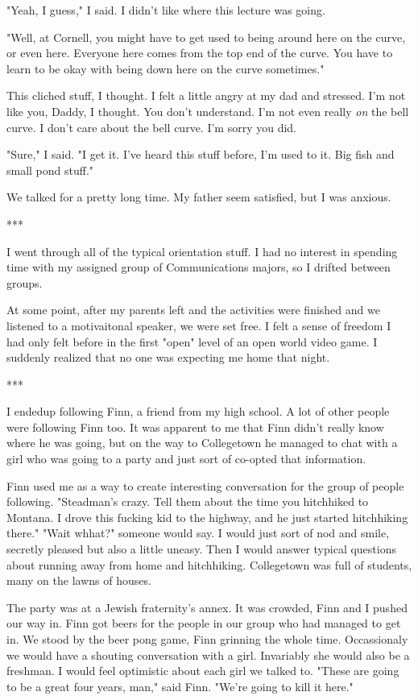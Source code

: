 \documentclass[12pt]{article}
\begin{document}
"Yeah, I guess," I said.  I didn't like where this lecture was going.

"Well, at Cornell, you might have to get used to being around here on the curve,
or even here.  Everyone here comes from the top end of the curve.  You have to
learn to be okay with being down here on the curve sometimes."

This cliched stuff, I thought.  I felt a little angry at my dad and stressed.
I'm not like you, Daddy, I thought.  You don't understand.  I'm not even really
\textit{on} the bell curve.  I don't care about the bell curve.  I'm sorry you
did.

"Sure," I said.  "I get it.  I've heard this stuff before, I'm used to it.  Big
fish and small pond stuff."

We talked for a pretty long time.  My father seem satisfied, but I was anxious.

***

I went through all of the typical orientation stuff.  I had no interest in
spending time with my assigned group of Communications majors, so I
drifted between groups. 

At some point, after my parents left and the activities were finished and we
listened to a motivaitonal speaker, we were set free.  I felt a sense of freedom
I had only felt before in the first "open" level of an open world video game.  I
suddenly realized that no one was expecting me home that night.

***

I endedup following Finn, a friend from my high school.  A lot of other people
were following Finn too.  It was apparent to me that Finn didn't really know
where he was going, but on the way to Collegetown he managed to chat with a girl
who was going to a party and just sort of co-opted that information.  

Finn used me as a way to create interesting conversation for the group of people
following.  "Steadman's crazy.  Tell them about the time you hitchhiked
to Montana.  I drove this fucking kid to the highway, and he just started
hitchhiking there."  "Wait whhat?" someone would say.  I would just sort of nod and
smile, secretly pleased but also a little uneasy.  Then I would answer typical
questions about running away from home and hitchhiking.  Collegetown was full of
students, many on the lawns of houses.

The party was at a Jewish fraternity's annex.  It was crowded, Finn and I pushed
our way in.  Finn got beers for the people in our group who had
managed to get in.  We stood by the beer pong game, Finn grinning the whole
time.  Occassionaly we would have a shouting conversation with a girl.
Invariably she would also be a freshman.  I would feel optimistic about each
girl we talked to.   "These are going to be a great four years, man," said Finn.
"We're going to kill it here."
\end{document}
